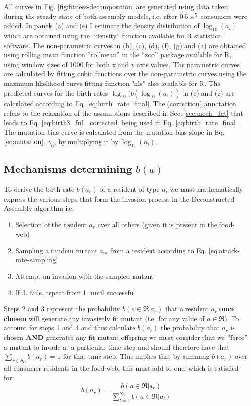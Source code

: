 \documentclass[a4paper]{report}
\DeclareMathOperator{\log}{log}
\begin{document}
All curves in Fig. \ref{fig:fitness-decomposition} are generated using data taken during the steady-state of both assembly models, i.e. after $0.5 \times^5$ consumers were added. In panels (a) and (e) I estimate the density distribution of $\log_{10}(a_i)$ which are obtained using the “density” function available for R statistical software. The non-parametric curves in (b), (c), (d), (f), (g) and (h) are obtained using rolling mean function “rollmean” in the “zoo” package  available for R, using window sizes of 1000 for both x and y axis values. The parametric curves are calculated by fitting cubic functions over the non-parametric curves using the maximum likelihood curve fitting function "nls" also available for R. The predicted curves for the birth rates $\log_{10}(b(\log_{10}(a_i))$ in (c) and (g) are calculated according to Eq. \eqref{eq:birth_rate_final}. The (correction) annotation refers to the relaxation of the assumptions described in Sec. \ref{sec:mech_det} that leads to Eq. \eqref{eq:birth3_full_corrected} being used in Eq. \eqref{eq:birth_rate_final}. The mutation bias curve is calculated from the mutation bias slope in Eq. $\eqref{eq:mutation}$, $\gamma_0$,  by multiplying it by $\log_{10}(a_i)$. 

\subsection{Mechanisms determining $b(a)$ \label{sec:mech_det}}

To derive the birth rate $b(a_{r})$ of a resident of type $a_{r}$ we must mathematically express 
the various steps that form the invasion process in the Deconstructed Assembly algorithm i.e.

\begin{enumerate}
\item Selection of the resident $a_{r}$ over all others (given it is present in the food-web)
\item Sampling a random mutant $a_{m}$ from a resident according to Eq. \eqref{eq:attack-rate-sampling}
\item Attempt an invasion with the sampled mutant
\item If 3. fails, repeat from 1. until successful
\end{enumerate}

Steps 2 and 3 represent the probability $b(a \in \Re|a_{r})$ that
a resident $a_{r}$ \textbf{once chosen} will generate any invasively
fit mutant (i.e. for any value of $a\in\Re$). To account for
steps 1 and 4 and thus calculate \textbf{$b(a_{r})$} the probability
that $a_{r}$ is chosen \textbf{AND} generates any fit mutant offspring
we must consider that we ''force'' a mutant to invade at a particular
time-step and should therefore have that $\sum_{r\in S_{C}}b(a_{r})=1$
for that time-step. This implies that by summing $b(a_{r})$ over all consumer residents
in the food-web, this must add to one, which is satisfied for: 
\begin{equation}
b(a_{r})=\frac{b(a\in\Re|a_{r})}{\sum_{l=1}^{S_C}b(a\in\Re|a_{l})} \label{eq:birth_rate_final}
\end{equation}
\end{document}
